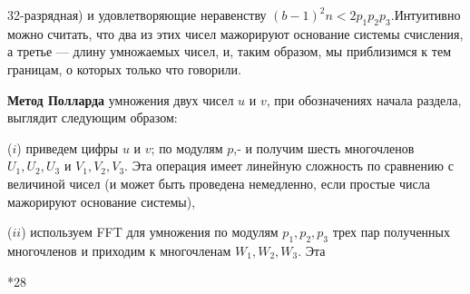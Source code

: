 32-разрядная) и удовлетворяющие неравенству $(b - 1)^{2}n < 2p_{1}p_{2}p_{3}$.Интуитивно можно считать, что два из этих чисел мажорируют основание системы счисления, а третье --- длину умножаемых чисел, и, таким образом, мы
приблизимся к тем границам, о которых только что говорили. \par
   \textbf{Метод Полларда} умножения двух чисел $u$ и $v$, при обозначениях
начала раздела, выглядит следующим образом: \par
($i$) приведем цифры $u$ и $v$; по модулям $p$,- и получим шесть 
многочленов $U_{1}, U_{2}, U_{3}$ и $V_{1},V_{2}, V_{3}$. Эта операция имеет линейную сложность по сравнению с величиной чисел (и может быть проведена немедленно, если простые числа мажорируют основание системы),\par
($ii$) используем FFT для умножения по модулям $p_{1}, p_{2}, p_{3}$ трех пар\linebreak
полученных многочленов и приходим к многочленам $W_{1}, W_{2}, W_{3}$. Эта \linebreak
\begin{flushleft}
\scriptsize
*28
\end{flushleft}

\pagebreak
\newpage


